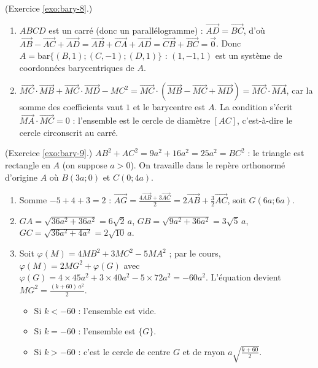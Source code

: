 \begin{corrige}
\begin{sol}
\end{sol}
%
\begin{sol} (Exercice \ref{exo:bary-8}.)
\begin{enumerate}
\item $ABCD$ est un carr\'e (donc un parall\'elogramme) : $\overrightarrow{AD} = \overrightarrow{BC}$, d'o\`u
      $\overrightarrow{AB} - \overrightarrow{AC} + \overrightarrow{AD} = \overrightarrow{AB} + \overrightarrow{CA} + \overrightarrow{AD} = \overrightarrow{CB} + \overrightarrow{BC} = \vec{0}$.
      Donc $A = \mathrm{bar}\{(B,1);(C,-1);(D,1)\}$ : $(1,-1,1)$ est un syst\`eme de coordonn\'ees barycentriques de $A$.
\item $\overrightarrow{MC}\cdot\overrightarrow{MB} + \overrightarrow{MC}\cdot\overrightarrow{MD} - MC^2 = \overrightarrow{MC}\cdot\left(\overrightarrow{MB} - \overrightarrow{MC} + \overrightarrow{MD}\right)
      = \overrightarrow{MC}\cdot\overrightarrow{MA}$, car la somme des coefficients vaut $1$ et le barycentre est $A$.
      La condition s'\'ecrit $\overrightarrow{MA}\cdot\overrightarrow{MC} = 0$ : l'ensemble est le cercle de diam\`etre $[AC]$,
      c'est-\`a-dire le cercle circonscrit au carr\'e.
\end{enumerate}
\end{sol}
%
\begin{sol} (Exercice \ref{exo:bary-9}.)
$AB^2 + AC^2 = 9a^2 + 16a^2 = 25a^2 = BC^2$ : le triangle est rectangle en $A$ (on suppose $a > 0$).
On travaille dans le rep\`ere orthonorm\'e d'origine $A$ o\`u $B(3a;0)$ et $C(0;4a)$.
\begin{enumerate}
\item Somme $-5 + 4 + 3 = 2$ : $\overrightarrow{AG} = \frac{4\overrightarrow{AB} + 3\overrightarrow{AC}}{2} = 2\overrightarrow{AB} + \frac{3}{2}\overrightarrow{AC}$, soit $G(6a;6a)$.
\item $GA = \sqrt{36a^2 + 36a^2} = 6\sqrt{2}\,a$, $GB = \sqrt{9a^2 + 36a^2} = 3\sqrt{5}\,a$, $GC = \sqrt{36a^2 + 4a^2} = 2\sqrt{10}\,a$.
\item Soit $\varphi(M) = 4MB^2 + 3MC^2 - 5MA^2$ ; par le cours, $\varphi(M) = 2MG^2 + \varphi(G)$ avec
      $\varphi(G) = 4\times 45a^2 + 3\times 40a^2 - 5\times 72a^2 = -60a^2$.
      L'\'equation devient $MG^2 = \frac{(k+60)\,a^2}{2}$.
      \begin{itemize}
      \item Si $k < -60$ : l'ensemble est vide.
      \item Si $k = -60$ : l'ensemble est $\{G\}$.
      \item Si $k > -60$ : c'est le cercle de centre $G$ et de rayon $a\sqrt{\frac{k+60}{2}}$.

\end{itemize}
\end{enumerate}
\end{sol}
\end{corrige}
